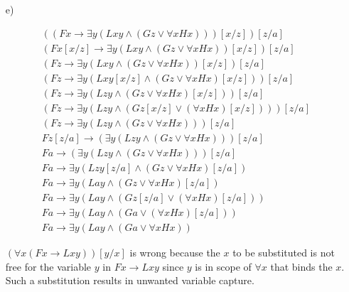 \begin{enumerate}[label=\alph*)]
\item[e)]

\begin{gather*}
((Fx \to \exists y (Lxy \land (Gz \lor \forall x Hx)))[x/z])[z/a] \\
(Fx[x/z] \to \exists y (Lxy \land (Gz \lor \forall x Hx))[x/z])[z/a] \\
(Fz \to \exists y (Lxy \land (Gz \lor \forall x Hx))[x/z])[z/a] \\
(Fz \to \exists y (Lxy[x/z] \land (Gz \lor \forall x Hx)[x/z]))[z/a] \\
(Fz \to \exists y (Lzy \land (Gz \lor \forall x Hx)[x/z]))[z/a] \\
(Fz \to \exists y (Lzy \land (Gz[x/z] \lor (\forall x Hx)[x/z])))[z/a] \\
(Fz \to \exists y (Lzy \land (Gz \lor \forall x Hx)))[z/a] \\
Fz[z/a] \to (\exists y (Lzy \land (Gz \lor \forall x Hx)))[z/a] \\
Fa \to (\exists y (Lzy \land (Gz \lor \forall x Hx)))[z/a] \\
Fa \to \exists y (Lzy[z/a] \land (Gz \lor \forall x Hx)[z/a]) \\
Fa \to \exists y (Lay \land (Gz \lor \forall x Hx)[z/a]) \\
Fa \to \exists y (Lay \land (Gz[z/a] \lor (\forall x Hx)[z/a])) \\
Fa \to \exists y (Lay \land (Ga \lor (\forall x Hx)[z/a])) \\
Fa \to \exists y (Lay \land (Ga \lor \forall x Hx))
\end{gather*}

$(\forall x (Fx \to Lxy))[y/x]$ is wrong because the $x$ to be substituted is not free for the variable $y$ in $Fx \to Lxy$ since $y$ is in scope of $\forall x$ that binds the $x$. Such a substitution results in unwanted variable capture.

\end{enumerate}